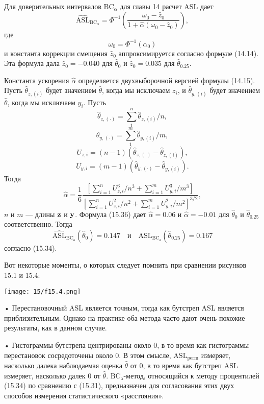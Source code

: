 Для доверительных интервалов $\text{BC}_{\alpha}$ для главы 14 расчет ASL дает
\begin{equation}
	\widehat{\text{ASL}}_{\text{BC}_{\alpha}} = \Phi^{-1} \left( \dfrac{\omega_0 - \hat{z}_0}{1 + \hat{\alpha}(\omega_0 - \hat{z}_0)} \right),
\end{equation}
где
\begin{equation}
	\omega_0 = \Phi^{-1}(\alpha_0)
\end{equation}
и константа коррекции смещения $\hat{z}_0$ аппроксимируется согласно формуле (14.14). Эта формула дала $\hat{z}_0 = -0.040$ для $\hat{\theta}_0$ и $\hat{z}_0 = 0.035$ для $\hat{\theta}_{0.25}$.

Константа ускорения $\hat{\alpha}$ определяется двухвыборочной версией формулы (14.15). Пусть $\hat{\theta}_{z,(i)}$ будет значением $\hat{\theta}$, когда мы исключаем $z_i$, и $\hat{\theta}_{y,(i)}$ будет значением $\hat{\theta}$, когда мы исключаем $y_i$. Пусть 
$$\hat{\theta}_{z,(\cdot)} = \sum\limits_{1}^{n} \hat{\theta}_{z,(i)}/n,$$
$$\hat{\theta}_{y,(\cdot)} = \sum\limits_{1}^{m} \hat{\theta}_{y,(i)}/m,$$
$$U_{z,i} = (n-1)(\hat{\theta}_{z,(\cdot)} - \hat{\theta}_{z,(i)}),$$
$$U_{y,i} = (m-1)(\hat{\theta}_{y,(\cdot)} - \hat{\theta}_{y,(i)}).$$
Тогда
\begin{equation}
	\hat{\alpha} = \dfrac{1}{6} \dfrac{[\sum_{i=1}^n U_{z,i}^{3} / n^3 + \sum_{i=1}^m U_{y,i}^3 / m^3]}{[\sum_{i=1}^n U_{z,i}^2 /n^2 + \sum_{i=1}^m U_{y,i}^2 / m^2]^{3/2}},
\end{equation}
$n$ и $m$ --- длины $\bf{z}$ и $\bf{y}$. Формула (15.36) дает $\hat{\alpha} = 0.06$ и $\hat{\alpha} = -0.01$ для $\hat{\theta}_0$ и $\hat{\theta}_{0.25}$ соответственно. Тогда
\begin{equation}
	\widehat{\text{ASL}}_{\text{BC}_{\text{a}}}(\hat{\theta}_0) = 0.147 \quad \text{и} \quad \widehat{\text{ASL}}_{\text{BC}_{\text{a}}}(\hat{\theta}_{0.25}) = 0.167
\end{equation}
согласно (15.34).

Вот некоторые моменты, о которых следует помнить при сравнении рисунков 15.1 и 15.4:

\noindent
\texttt{[image: 15/f15.4.png]}
\newline

• Перестановочный ASL является точным, тогда как бутстреп ASL является приблизительным. Однако на практике оба метода часто дают очень похожие результаты, как в данном случае.

• Гистограммы бутстрепа центрированы около 0, в то время как гистограммы перестановок сосредоточены около 0. В этом смысле, $\text{ASL}_\text{perm}$ измеряет, насколько далека наблюдаемая оценка $\hat{\theta}$ от 0, в то время как бутстреп ASL измеряет, насколько далек 0 от $\hat{\theta}$. $\text{BC}_\text{a}$-метод, относящийся к методу процентилей (15.34) по сравнению с (15.31), предназначен для согласования этих двух способов измерения статистического «расстояния».


